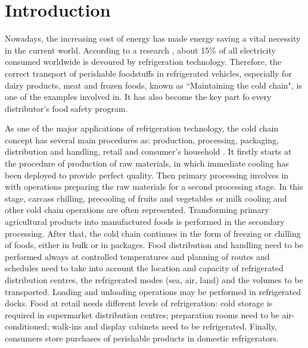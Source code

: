 \chapter*{Introduction}         %

Nowadays, the increasing cost of energy has made energy saving a vital necessity in the current world.
According to a research \citep{coulomb2008refrigeration}, about 15\% of all electricity consumed worldwide is devoured by refrigeration technology. Therefore, the correct transport of perishable foodstuffs in refrigerated vehicles, especially for dairy products, meat and frozen foods, known as ``Maintaining the cold chain", is one of the examples involved in. It has also become the key part fo every distributor's food safety program.

As one of the major applications of refrigeration technology, the cold chain concept has several main procedures as: production, processing, packaging, distribution and handling, retail and consumer's household \citep{Estrada-Flores2010}. It firstly starts at the procedure of production of raw materials, in which immediate cooling has been deployed to provide perfect quality. Then primary processing involves in with operations preparing the raw materials for a second processing stage.  In this stage, carcass chilling, precooling of fruits and vegetables or milk cooling and other cold chain operations are often represented. Transforming primary agricultural products into manufactured foods is performed in the secondary processing. After that, the cold chain continues in the form of freezing or chilling of foods, either in bulk or in packages. Food distribution and handling need to be performed always at controlled temperatures and planning of routes and schedules need to take into account the location and capacity of refrigerated distribution centres, the refrigerated modes (sea, air, land) and the volumes to be transported. Loading and unloading operations may be performed in refrigerated docks. Food at retail needs different levels of refrigeration: cold storage is required in supermarket distribution centres; preparation rooms  need to be air-conditioned; walk-ins and display cabinets need to be refrigerated. Finally, consumers store purchases of perishable products in domestic refrigerators.